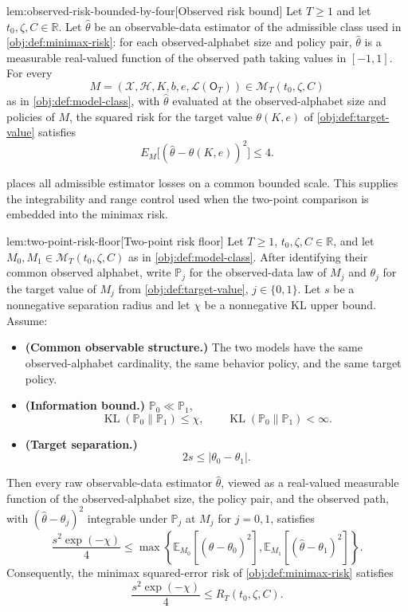 \begin{lemmav}{lem:observed-risk-bounded-by-four}[Observed risk bound]
Let \(T\ge 1\) and let \(t_0,\zeta,C\in\mathbb R\). Let \(\widehat\theta\) be an observable-data estimator of the admissible class used in \cref{obj:def:minimax-risk}: for each observed-alphabet size and policy pair, \(\widehat\theta\) is a measurable real-valued function of the observed path taking values in \([-1,1]\). For every
\[
M=(\mathcal X,\mathcal H,K,b,e,\mathcal L(\mathsf O_T))\in \mathcal M_T(t_0,\zeta,C)
\]
as in \cref{obj:def:model-class}, with \(\widehat\theta\) evaluated at the observed-alphabet size and policies of \(M\), the squared risk for the target value \(\theta(K,e)\) of \cref{obj:def:target-value} satisfies
\[
E_M\bigl[(\widehat\theta-\theta(K,e))^2\bigr]\le 4 .
\]
\end{lemmav}

 places all admissible estimator losses on a common bounded scale. This supplies the integrability and range control used when the two-point comparison is embedded into the minimax risk.

\begin{lemmav}{lem:two-point-risk-floor}[Two-point risk floor]
Let \(T\ge 1\), \(t_0,\zeta,C\in\mathbb R\), and let \(M_0,M_1\in\mathcal M_T(t_0,\zeta,C)\) as in \cref{obj:def:model-class}.  After identifying their common observed alphabet, write \(\mathbb P_j\) for the observed-data law of \(M_j\) and \(\theta_j\) for the target value of \(M_j\) from \cref{obj:def:target-value}, \(j\in\{0,1\}\).  Let \(s\) be a nonnegative separation radius and let \(\chi\) be a nonnegative KL upper bound.  Assume:
\begin{itemize}
\item \textbf{(Common observable structure.)} The two models have the same observed-alphabet cardinality, the same behavior policy, and the same target policy.
\item \textbf{(Information bound.)} \(\mathbb P_0\ll\mathbb P_1\),
\[
\operatorname{KL}(\mathbb P_0\|\mathbb P_1)\le \chi,
\qquad
\operatorname{KL}(\mathbb P_0\|\mathbb P_1)<\infty .
\]
\item \textbf{(Target separation.)}
\[
2s\le |\theta_0-\theta_1| .
\]
\end{itemize}
Then every raw observable-data estimator \(\widehat\theta\), viewed as a real-valued measurable function of the observed-alphabet size, the policy pair, and the observed path, with \((\widehat\theta-\theta_j)^2\) integrable under \(\mathbb P_j\) at \(M_j\) for \(j=0,1\), satisfies
\[
\frac{s^2\exp(-\chi)}{4}
\le
\max\left\{
\mathbb E_{M_0}\!\left[(\widehat\theta-\theta_0)^2\right],
\mathbb E_{M_1}\!\left[(\widehat\theta-\theta_1)^2\right]
\right\}.
\]
Consequently, the minimax squared-error risk of \cref{obj:def:minimax-risk} satisfies
\[
\frac{s^2\exp(-\chi)}{4}
\le
R_T(t_0,\zeta,C).
\]
\end{lemmav}

